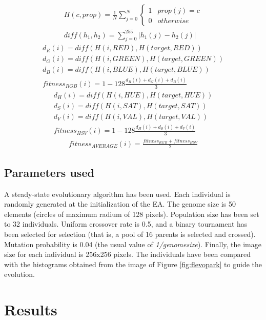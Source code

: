 \documentclass[conference]{IEEEtran}
\begin{document}
\begin{eqnarray}
	\label{eq:histogram}
	H(c, prop) = \frac{1}{N}\sum_{j=0}^N \left\{\begin{matrix}
1 & prop(j) = c\\ 
0 & otherwise
\end{matrix}\right. \\
\label{eq:diff}
diff(h_1, h_2) = \sum_{j=0}^{255} |h_1(j) - h_2(j)|
\end{eqnarray}
\begin{eqnarray}
	d_R(i) = diff(H(i, RED), H(target, RED))\\
	d_G(i) = diff(H(i, GREEN), H(target, GREEN))\\
	d_B(i) =  diff(H(i, BLUE), H(target, BLUE))\\
	\label{eq:RGB}
	fitness_{RGB}(i) = 1 - 128\frac{d_R(i) + d_G(i) + d_B(i)}{3}
\end{eqnarray}
\begin{eqnarray}
	d_H(i) = diff(H(i, HUE), H(target, HUE))\\
	d_S(i) = diff(H(i, SAT), H(target, SAT))\\
	d_V(i) =  diff(H(i, VAL), H(target, VAL))\\
	\label{eq:HSV}
	fitness_{HSV}(i) = 1 - 128\frac{d_H(i) + d_S(i) + d_V(i)}{3}
\end{eqnarray}
\begin{eqnarray}
	\label{eq:AVERAGE}
	fitness_{AVERAGE}(i) = \frac{fitness_{RGB}+fitness_{HSV}}{2}
\end{eqnarray}


\subsection{Parameters used}

A steady-state evolutionary algorithm has been used. Each individual is randomly generated at the initialization of the EA. The genome size is 50 elements (circles of maximum radium of 128 pixels). Population size has been set to 32 individuals. Uniform crossover rate is 0.5, and a binary tournament has been selected for selection (that is, a pool of 16 parents is selected and crossed). Mutation probability is 0.04 (the usual value of {\em 1/genomesize}). Finally, the image size for each individual is 256x256 pixels. The individuals have been compared with the histograms obtained from the image of Figure \ref{fig:flevopark} to guide the evolution.

\section{Results} 
\label{sec:results}
\end{document}
